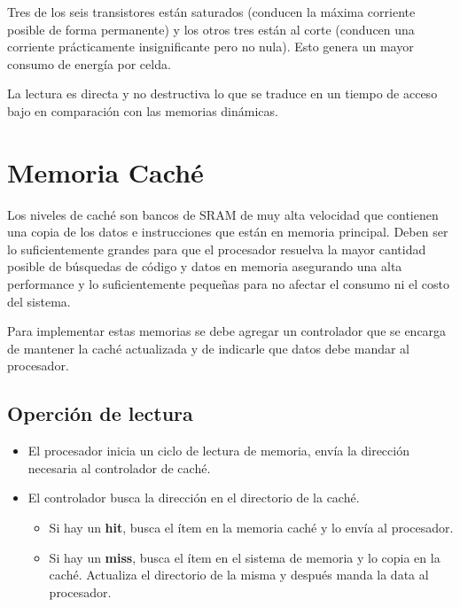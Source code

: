 \begin{itemize}
\begin{itemize}
 		Tres de los seis transistores están saturados (conducen la máxima corriente posible de forma permanente) y los otros tres están al corte (conducen una corriente prácticamente insignificante pero no nula). Esto genera un mayor consumo de energía por celda.
 		
 		La lectura es directa y no destructiva lo que se traduce en un tiempo de acceso bajo en comparación con las memorias dinámicas.
	\end{itemize}

\end{itemize}

\newpage
\section{Memoria Caché}
Los niveles de caché son bancos de SRAM de muy alta velocidad que contienen una copia de los datos e instrucciones que están en memoria principal. Deben ser lo suficientemente grandes para que el procesador resuelva la mayor cantidad posible de búsquedas de código y datos en memoria asegurando una alta performance y lo suficientemente pequeñas para no afectar el consumo ni el costo del sistema.

Para implementar estas memorias se debe agregar un controlador que se encarga de mantener la caché actualizada y de indicarle que datos debe mandar al procesador.

\subsection{Operción de lectura}
\begin{itemize}
	\item El procesador inicia un ciclo de lectura de memoria, envía la dirección necesaria al controlador de caché.
	\item El controlador busca la dirección en el directorio de la caché.
	\begin{itemize}
		\item Si hay un \textbf{hit}, busca el ítem en la memoria caché y lo envía al procesador.
		\item Si hay un \textbf{miss},  busca el ítem en el sistema de memoria y lo copia en la caché. Actualiza el directorio de la misma y después manda la data al procesador.
	\end{itemize}
\end{itemize}

